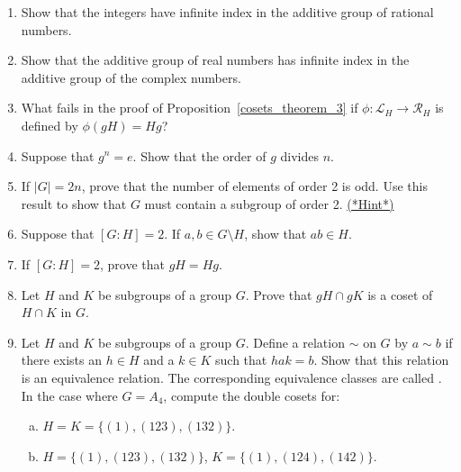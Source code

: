 {{\begin{enumerate}
\item
Show that the integers have infinite index in the additive group of rational numbers.
 
\item
Show that the additive group of real numbers has infinite index in the additive group of the complex numbers.
 
 
\item
What fails in the proof of Proposition~\ref{cosets_theorem_3} if $\phi :  {\mathcal L}_H \rightarrow {\mathcal R}_H$ is defined by $\phi( gH ) = Hg$?
 
\item
Suppose that $g^n = e$. Show that the order of $g$ divides
$n$.
 

\item \label{eoc:cosets:1}
If $|G| = 2n$, prove that the number of elements of order 2 is odd.  Use this result to show that $G$ must contain a subgroup of order 2.
\hyperref[sec:cosets:hints]{(*Hint*)}

\item
Suppose that $[G : H] = 2$. If $a, b \in G \setminus H$, show that $ab \in H$.

\item
If $[G : H] = 2$, prove that $gH = Hg$.

\item
Let $H$ and $K$ be subgroups of a group $G$.  Prove that $gH \cap gK$ is a coset of $H \cap K$ in $G$.  
 
\item
Let $H$ and $K$ be subgroups of a group $G$.  Define a relation $\sim$ on $G$ by $a \sim b$ if there exists an $h \in H$ and a $k \in K$ such that $hak = b$.  Show that this relation is an equivalence relation.  The corresponding equivalence classes are called .  In the case where $G = A_4$, compute the double cosets for:
\begin{enumerate}[(a)]
\item
$H = K =  \{ (1),(123), (132) \}$.
\item
$H  =  \{ (1),(123), (132) \}$, $K  =  \{ (1),(124), (142) \}$. 
\end{enumerate}
 

\end{enumerate}}}
